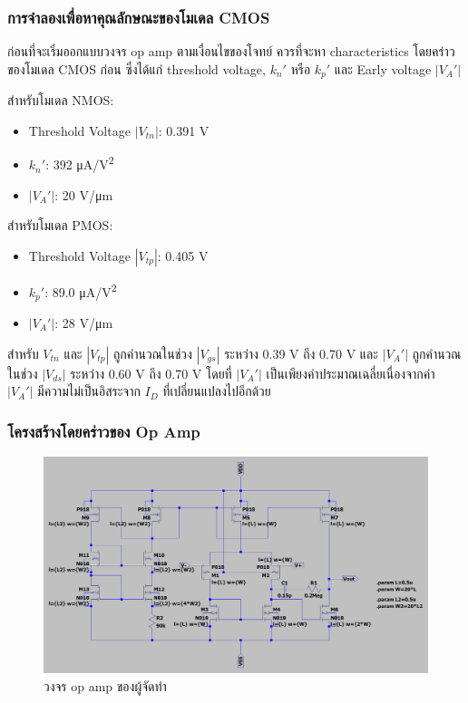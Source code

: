 \documentclass[a4paper, 11pt, oneside]{book} %
\begin{document}
\subsubsection{การจำลองเพื่อหาคุณลักษณะของโมเดล CMOS}

ก่อนที่จะเริ่มออกแบบวงจร op amp ตามเงื่อนไขของโจทย์ ควรที่จะหา characteristics โดยคร่าวของโมเดล CMOS ก่อน ซึ่งได้แก่ threshold voltage, $k_{n}'$ หรือ $k_{p}'$ และ Early voltage $|V_A'|$

สำหรับโมเดล NMOS:
\begin{itemize}
    \item Threshold Voltage $|V_{tn}|$: 0.391 V
    \item $k_{n}'$: 392 \si{\micro A/V^2}
    \item $|V_A'|$: 20 \si{V/\micro m}
\end{itemize}

สำหรับโมเดล PMOS:
\begin{itemize}
    \item Threshold Voltage $|V_{tp}|$: 0.405 V
    \item $k_{p}'$: 89.0 \si{\micro A/V^2}
    \item $|V_A'|$: 28 \si{V/\micro m}
\end{itemize}

สำหรับ $V_{tn}$ และ $|V_{tp}|$ ถูกคำนวณในช่วง $|V_{gs}|$ ระหว่าง 0.39 V ถึง 0.70 V และ $|V_A'|$ ถูกคำนวณในช่วง $|V_{ds}|$ ระหว่าง 0.60 V ถึง 0.70 V โดยที่ $|V_A'|$ เป็นเพียงค่าประมาณเฉลี่ยเนื่องจากค่า $|V_A'|$ มีความไม่เป็นอิสระจาก $I_D$ ที่เปลี่ยนแปลงไปอีกด้วย

\subsubsection{โครงสร้างโดยคร่าวของ Op Amp}

\begin{figure}[h]
    \includegraphics[width = \linewidth]{my_op_amp}
    \caption{วงจร op amp ของผู้จัดทำ}
    \label{my_op_amp}
\end{figure}
\end{document}
